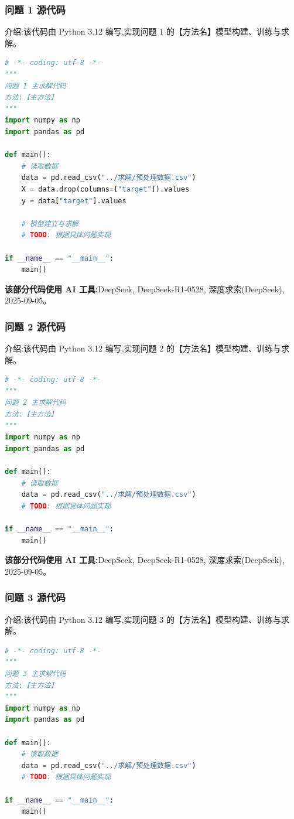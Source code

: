 \subsubsection*{问题 1 源代码}

介绍:该代码由 Python 3.12 编写,实现问题 1 的【方法名】模型构建、训练与求解。

\begin{lstlisting}[language=Python,caption={问题 1 主求解代码}]
# -*- coding: utf-8 -*-
"""
问题 1 主求解代码
方法:【主方法】
"""
import numpy as np
import pandas as pd

def main():
    # 读取数据
    data = pd.read_csv("../求解/预处理数据.csv")
    X = data.drop(columns=["target"]).values
    y = data["target"].values

    # 模型建立与求解
    # TODO: 根据具体问题实现

if __name__ == "__main__":
    main()
\end{lstlisting}

\noindent\textbf{该部分代码使用 AI 工具:}DeepSeek, DeepSeek-R1-0528, 深度求索(DeepSeek), 2025-09-05。

\subsubsection*{问题 2 源代码}

介绍:该代码由 Python 3.12 编写,实现问题 2 的【方法名】模型构建、训练与求解。

\begin{lstlisting}[language=Python,caption={问题 2 主求解代码}]
# -*- coding: utf-8 -*-
"""
问题 2 主求解代码
方法:【主方法】
"""
import numpy as np
import pandas as pd

def main():
    # 读取数据
    data = pd.read_csv("../求解/预处理数据.csv")
    # TODO: 根据具体问题实现

if __name__ == "__main__":
    main()
\end{lstlisting}

\noindent\textbf{该部分代码使用 AI 工具:}DeepSeek, DeepSeek-R1-0528, 深度求索(DeepSeek), 2025-09-05。

\subsubsection*{问题 3 源代码}

介绍:该代码由 Python 3.12 编写,实现问题 3 的【方法名】模型构建、训练与求解。

\begin{lstlisting}[language=Python,caption={问题 3 主求解代码}]
# -*- coding: utf-8 -*-
"""
问题 3 主求解代码
方法:【主方法】
"""
import numpy as np
import pandas as pd

def main():
    # 读取数据
    data = pd.read_csv("../求解/预处理数据.csv")
    # TODO: 根据具体问题实现

if __name__ == "__main__":
    main()
\end{lstlisting}


